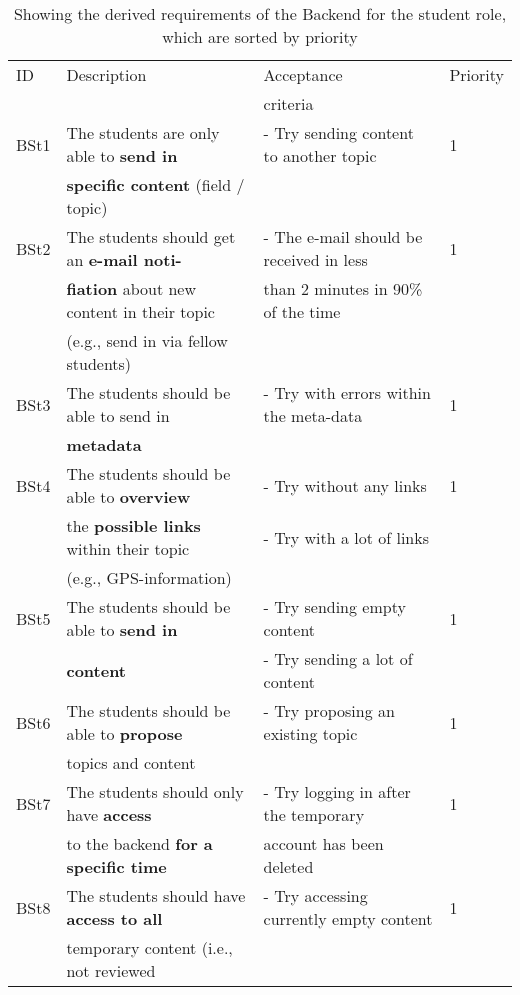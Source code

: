 \documentclass[twoside,openright,fleqn,pointlessnumbers,headinclude,,11pt,a4paper,BCOR5mm,footinclude,cleardoubleempty,abstracton %
                ]{scrreprt}
\begin{document}
	\begin{table}[h]
			\caption{Showing the derived requirements of the Backend for the student role, which are sorted by priority}
	\centering%
	\begin{tabular}{llll}
	\hline
	ID 	& Description 	& Acceptance 	& Priority \\
	 	& 			 & criteria 	&  \\
		\hline
	BSt1 & The students are only able to \textbf{send in} 		& - Try sending content to another topic & 1	\\
	 	& \textbf{specific content} (field / topic) 				&  & 		\\
	\hline
	BSt2	& The students should get an \textbf{e-mail noti-} 	& - The e-mail should be received in less & 1	\\
	 	& \textbf{fiation} about new content in their topic 	& than 2 minutes in 90\% of the time & 	\\
	 	& (e.g., send in via fellow students) 			&  & 	\\
	\hline
	BSt3 & The students should be able to send in  		& - Try with errors within the meta-data & 1\\
	 	& \textbf{metadata} 							&  & \\
	\hline
	BSt4 & The students should be able to \textbf{overview} 	& - Try without any links & 1\\
	 	& the \textbf{possible links} within their topic 			& - Try with a lot of links & \\
	 	& (e.g., GPS-information) 						&  & \\
	\hline
	BSt5 & The students should be able to \textbf{send in}  		& - Try sending empty content  & 1\\
	 	& \textbf{content}								& - Try sending a lot of content  & \\
	\hline
	BSt6 & The students should be able to \textbf{propose}  	& - Try proposing an existing topic  & 1\\
	 	& topics and content  				    			&  & \\
	\hline
	BSt7 & The students should only have \textbf{access}  		& - Try logging in after the temporary & 1\\
		& to the backend \textbf{for a specific time} 			& account has been deleted	& \\	
	\hline
	BSt8 & The students should have \textbf{access to all} 		& - Try accessing currently empty content  	& 1\\
		& temporary content (i.e., not reviewed 				&	& \\

\end{tabular}
\end{table}
\end{document}
